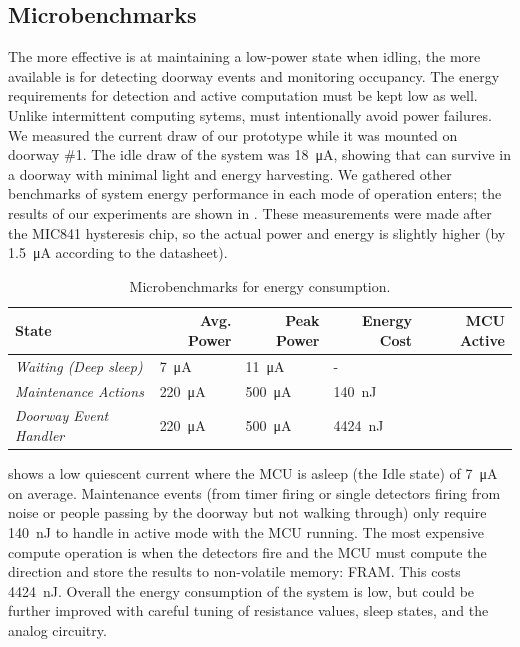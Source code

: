 \subsection{Microbenchmarks}
\label{sec:microbenchmarks}
The more effective \sysname is at maintaining a low-power state when idling, the more available \sysname is for detecting doorway events and monitoring occupancy.
The energy requirements for detection and active computation must be kept low as well.
Unlike intermittent computing sytems, \sysname must intentionally avoid power failures.
We measured the current draw of our \sysname prototype while it was mounted on doorway \#1.
The idle draw of the system was \SI{18}{\micro\ampere}, showing that \sysname can survive in a doorway with minimal light and energy harvesting.
We gathered other benchmarks of system energy performance in each mode of operation \sysname enters; the results of our experiments are shown in . These measurements were made after the MIC841 hysteresis chip, so the actual power and energy is slightly higher (by \SI{1.5}{\micro\ampere} according to the datasheet).


%
\begin{table}[t]
\footnotesize
\caption{Microbenchmarks for \sysname energy consumption.}
\label{tab:microbenchmarks}
\begin{tabular}{@{}p{1.4in}lllc@{}}
\toprule
\textbf{State}          & \multicolumn{1}{r}{\textbf{Avg. Power}} & \multicolumn{1}{r}{\textbf{Peak Power}} & \multicolumn{1}{r}{\textbf{Energy Cost}} & \multicolumn{1}{r}{\textbf{MCU Active}} \\ \midrule
\textit{Waiting (Deep sleep)}       	& \SI{7}{\micro\ampere}	&  \SI{11}{\micro\ampere}	& - & \textcolor{magenta}{\xmark} \\
\textit{Maintenance Actions} & \SI{220}{\micro\ampere}	& \SI{500}{\micro\ampere}	& \SI{140}{\nano\joule}	 & \textcolor{green}{\cmark} \\
\textit{Doorway Event Handler} & \SI{220}{\micro\ampere}	& \SI{500}{\micro\ampere}	&  \SI{4424}{\nano\joule}     & \textcolor{green}{\cmark} \\ \midrule
\end{tabular}
\end{table}


 shows a low quiescent current where the MCU is asleep (the Idle state) of \SI{7}{\micro\ampere} on average. Maintenance events (from timer firing or single detectors firing from noise or people passing by the doorway but not walking through) only require \SI{140}{\nano\joule} to handle in active mode with the MCU running.
The most expensive compute operation is when the detectors fire and the MCU must compute the direction and store the results to non-volatile memory: FRAM. This costs \SI{4424}{\nano\joule}.
Overall the energy consumption of the system is low, but could be further improved with careful tuning of resistance values, sleep states, and the analog circuitry.

